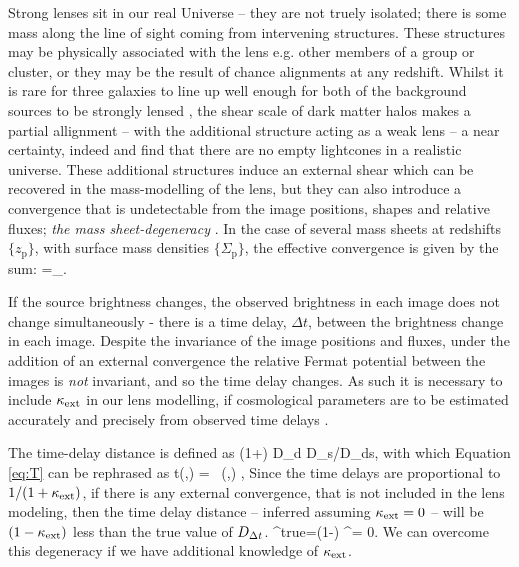 \documentclass[useAMS,usenatbib]{mn2e}
\begin{document}
Strong lenses sit in our real Universe -- they are not truely isolated;
there is some mass along the line of sight coming from intervening structures.
These structures may be physically associated with the lens e.g. other members
of a group or cluster, or they may be the result of chance alignments at any redshift. 
Whilst it is rare for three galaxies to line up well enough for both of the background sources
to be strongly lensed \citep{gavazzi2008,collett2012}, the shear scale of dark matter halos
makes a partial allignment -- with the additional structure acting as a weak lens -- 
a near certainty, indeed \citet{valewhite2003} and \citet{hilbert2007} find that there
are no empty lightcones in a realistic universe. These additional structures induce an external shear
which can be recovered in the mass-modelling of the lens, but they can also introduce a convergence that
is undetectable from the image positions, shapes and relative fluxes; {\it the mass sheet-degeneracy} \citep[see e.g.][for details]{Falco1985,Schneider2006}.
In the case of several mass sheets at redshifts $\{z_{\mathrm{p}}\}$, with surface mass densities $\{\Sigma_{\mathrm{p}}\}$, the effective convergence is given by the  sum:
\be \label{eq:kappasum}
\kappax=\sum_{}.
\ee

If the source brightness changes, the observed brightness in each image does not change
simultaneously - there is a time delay, $\Delta t$, between the brightness change in
each image. Despite the invariance of the image positions and fluxes, under the addition
of an external convergence the relative Fermat potential between the images is {\it not}
invariant, and so the time delay changes. As such it is necessary to include $\kappa_{\rm ext}$
in our lens modelling, if cosmological parameters are to be estimated accurately and
precisely from observed time delays \citep{suyu2010}.

The time-delay distance is defined as
\be \label{eq:dt}
\Dt \equiv (1+\zd) D_{\rm d} D_{\rm s}/D_{\rm ds},
\ee
with which Equation \ref{eq:T} can be rephrased as
\be
\Delta t(\bmath{\theta},\bmath{\beta})  =   \, \phi(\bmath{\theta},\bmath{\beta})    ,
\ee 
Since the time delays are proportional to $1/ (1+ \kappa_{\rm ext})$, if there is any external convergence, that is not included in the lens
modeling, then the time delay distance -- inferred assuming $\kappa_{\rm ext} = 0$ -- will be
$(1-\kappa_{\rm ext})$ less than the true value of $D_{\Delta t}$.
\be 
\label{eq:MassSheet:H0bias}
\Dt^{\rm{true}}=(1-\kappax) \Dt^{{\kappax = 0}}.
\ee
We can overcome this degeneracy if we have additional knowledge of $\kappa_{\rm ext}$.
\end{document}
